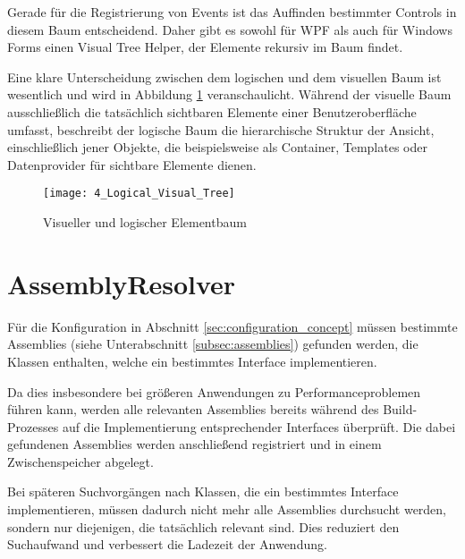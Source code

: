 Gerade für die Registrierung von Events ist das Auffinden bestimmter Controls in diesem Baum entscheidend. Daher gibt es sowohl für WPF als auch für Windows Forms einen Visual Tree Helper, der Elemente rekursiv im Baum findet.

Eine klare Unterscheidung zwischen dem logischen und dem visuellen Baum ist wesentlich und wird in Abbildung \ref{fig:logical_visual_tree} veranschaulicht. Während der visuelle Baum ausschließlich die tatsächlich sichtbaren Elemente einer Benutzeroberfläche umfasst, beschreibt der logische Baum die hierarchische Struktur der Ansicht, einschließlich jener Objekte, die beispielsweise als Container, Templates oder Datenprovider für sichtbare Elemente dienen.

\begin{figure}[H]
    \centering
    \texttt{[image: 4\_Logical\_Visual\_Tree]}
    \caption{Visueller und logischer Elementbaum}
    \label{fig:logical_visual_tree}
\end{figure}

\section{AssemblyResolver}
\label{sec:assembly_resolver}
Für die Konfiguration in Abschnitt \ref{sec:configuration_concept} müssen bestimmte Assemblies (siehe Unterabschnitt \ref{subsec:assemblies}) gefunden werden, die Klassen enthalten, welche ein bestimmtes Interface implementieren.

Da dies insbesondere bei größeren Anwendungen zu Performanceproblemen führen kann, werden alle relevanten Assemblies bereits während des Build-Prozesses auf die Implementierung entsprechender Interfaces überprüft. Die dabei gefundenen Assemblies werden anschließend registriert und in einem Zwischenspeicher abgelegt.

Bei späteren Suchvorgängen nach Klassen, die ein bestimmtes Interface implementieren, müssen dadurch nicht mehr alle Assemblies durchsucht werden, sondern nur diejenigen, die tatsächlich relevant sind. Dies reduziert den Suchaufwand und verbessert die Ladezeit der Anwendung.